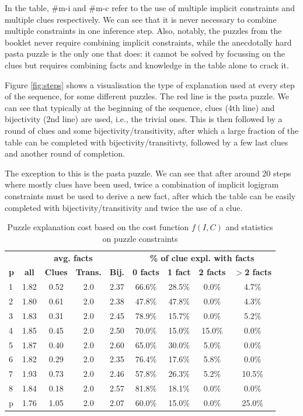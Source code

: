 In the table, \#m-i and \#m-c refer to the use of multiple implicit constraints and multiple clues respectively. We can see that it is never necessary to combine multiple constraints in one inference step. Also, notably, the puzzles from the booklet never require combining implicit constraints, while the anecdotally hard pasta puzzle is the only one that does: it cannot be solved by focussing on the clues but requires combining facts and knowledge in the table alone to crack it.

 Figure \ref{fig:steps} shows a visualisation the type of explanation used at every step of the sequence, for some different puzzles. The red line is the pasta puzzle. We can see that typically at the beginning of the sequence, clues (4th line) and bijectivity (2nd line) are used, i.e., the trivial ones. This is then followed by a round of clues and some bijectivity/transitivity, after which a large fraction of the table can be completed with bijectivity/transitivty, followed by a few last clues and another round of completion.

The exception to this is the pasta puzzle. We can see that after around 20 steps where mostly clues have been used, twice a combination of implicit logigram constraints must be used to derive a new fact, after which the table can be easily completed with bijectivity/transitivity and twice the use of a clue.

\begin{table}
	\centering
		\begin{tabular}{l|c|ccc|cccc} 
		    & \multicolumn{4}{c|}{\bf avg. facts} & \multicolumn{4}{c}{\bf \% of clue expl. with facts} \\
			\textbf{p} & \textbf{all} & \textbf{Clues} & \textbf{Trans.} & \textbf{Bij.} & \textbf{0 facts} & \textbf{1 fact} & \textbf{2 facts} & \textbf{$>$2 facts}\\ 
\hline
	1 & 1.82 & 0.52 & 2.0 & 2.37 &66.6\% &28.5\% &0.0\% &4.7\% \\ 
	2 & 1.80 & 0.61 & 2.0 & 2.38 &47.8\% &47.8\% &0.0\% &4.3\% \\ 
	3 & 1.83 & 0.31 & 2.0 & 2.45 &78.9\% &15.7\% &0.0\% &5.2\% \\ 
	4 & 1.85 & 0.45 & 2.0 & 2.50 &70.0\% &15.0\% &15.0\% &0.0\% \\ 
	5 & 1.87 & 0.40 & 2.0 & 2.60 &65.0\% &30.0\% &5.0\% &0.0\% \\ 
	6 & 1.82 & 0.29 & 2.0 & 2.35 &76.4\% &17.6\% &5.8\% &0.0\% \\ 
	7 & 1.93 & 0.73 & 2.0 & 2.46 &57.8\% &26.3\% &5.2\% &10.5\% \\ 
	8 & 1.84 & 0.18 & 2.0 & 2.57 &81.8\% &18.1\% &0.0\% &0.0\% \\ 
	p & 1.76 & 1.05 & 2.0 & 2.07 &60.0\% &15.0\% &0.0\% &25.0\% \\ 
		\end{tabular} 
	\caption{Puzzle explanation cost based on the cost function $f(I, C)$ and statistics on puzzle constraints}
	\label{table:sequence_leve}
\end{table}

